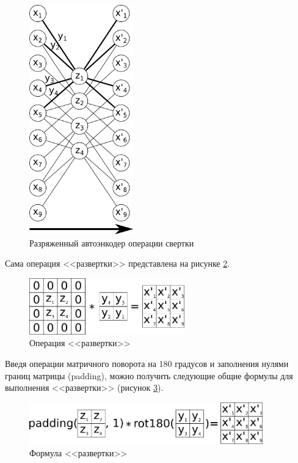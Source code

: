 \begin{figure}[H]
  \centering
  \includegraphics[width=0.4\textwidth]{man-source/images/ch2/pic2-5.png}
  \caption{Разряженный автоэнкодер операции свертки}
  \label{fig:convolution_autoencoder}
\end{figure}

Сама операция <<развертки>> представлена на рисунке \ref{fig:deconvolution}.

\begin{figure}[H]
  \centering
  \includegraphics[width=0.6\textwidth]{man-source/images/ch2/pic2-6.png}
  \caption{Операция <<развертки>>}
  \label{fig:deconvolution}
\end{figure}

Введя операции матричного поворота на 180 градусов и заполнения нулями границ матрицы (padding), можно получить следующие общие формулы для выполнения <<развертки>> (рисунок \ref{fig:deconvolution_formula}).

\begin{figure}[H]
  \centering
  \includegraphics[width=0.9\textwidth]{man-source/images/ch2/pic2-9.png}
  \caption{Формула <<развертки>>}
  \label{fig:deconvolution_formula}
\end{figure}

